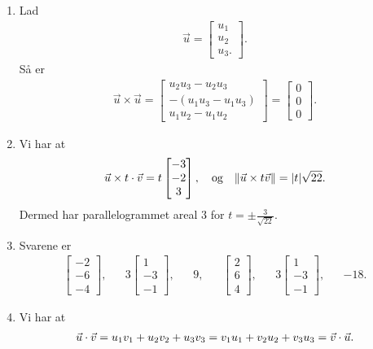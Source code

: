\begin{enumerate}
	\item Lad 
	\begin{align*}
	\vec{u}=\begin{bmatrix}
	u_1\\u_2\\u_3.
	\end{bmatrix}.
	\end{align*}
	Så er
	\begin{align*}
	\vec{u}\times \vec{u}=\begin{bmatrix}
	u_2u_3-u_2u_3\\-(u_1u_3-u_1u_3)\\u_1u_2-u_1u_2
	\end{bmatrix}=\begin{bmatrix}
	0\\0\\0
	\end{bmatrix}.
	\end{align*}
	\item Vi har at
		\begin{align*}
	\vec{u}\times t\cdot\vec{v}=t\begin{bmatrix}
	-3\\-2\\3
	\end{bmatrix},\quad \textup{og}\quad \Vert \vec{u}\times t \vec{v}\Vert=\vert t\vert\sqrt{22}.
	\end{align*}
	Dermed har parallelogrammet areal $3$ for $t=\pm \frac{3}{\sqrt{22}}$.

	\item Svarene er
	\begin{align*}
	\begin{bmatrix}
	-2\\-6\\-4
	\end{bmatrix},&&3\begin{bmatrix}
	1\\-3\\-1
	\end{bmatrix},&& 9,&& \begin{bmatrix}
	2\\6\\4
	\end{bmatrix},&& 3\begin{bmatrix}
	1\\-3\\-1
	\end{bmatrix},&&-18.
	\end{align*}
	
	\item Vi har at
	\begin{align*}
	\vec{u}\cdot \vec{v}=u_1v_1+u_2v_2+u_3v_3=v_1u_1+v_2u_2+v_3u_3=\vec{v}\cdot \vec{u}.
	\end{align*}
	

\end{enumerate}
